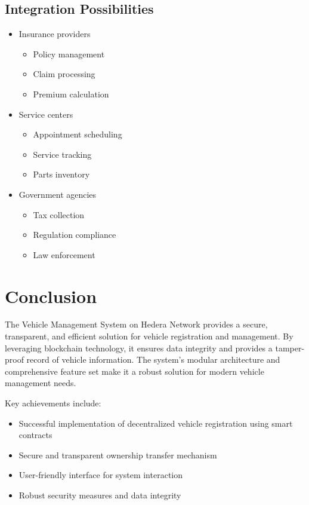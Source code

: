 \documentclass[12pt,a4paper]{article}
\begin{document}
    \subsection{Integration Possibilities}
    \begin{itemize}
        \item Insurance providers
        \begin{itemize}
            \item Policy management
            \item Claim processing
            \item Premium calculation
        \end{itemize}

        \item Service centers
        \begin{itemize}
            \item Appointment scheduling
            \item Service tracking
            \item Parts inventory
        \end{itemize}

        \item Government agencies
        \begin{itemize}
            \item Tax collection
            \item Regulation compliance
            \item Law enforcement
        \end{itemize}
    \end{itemize}


    \section{Conclusion}
    The Vehicle Management System on Hedera Network provides a secure, transparent, and efficient solution for vehicle registration and management. By leveraging blockchain technology, it ensures data integrity and provides a tamper-proof record of vehicle information. The system's modular architecture and comprehensive feature set make it a robust solution for modern vehicle management needs.

    Key achievements include:
    \begin{itemize}
        \item Successful implementation of decentralized vehicle registration using smart contracts
        \item Secure and transparent ownership transfer mechanism
        \item User-friendly interface for system interaction
        \item Robust security measures and data integrity
    \end{itemize}
\end{document}
